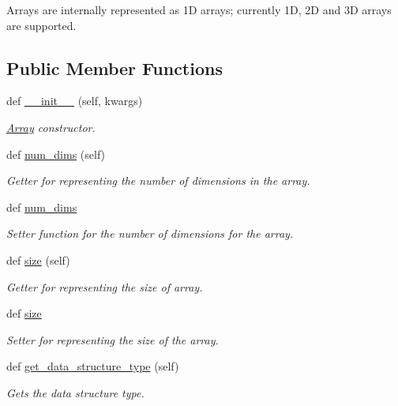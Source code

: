 Arrays are internally represented as 1D arrays; currently 1D, 2D and 3D arrays are supported. \subsection*{Public Member Functions}
\begin{DoxyCompactItemize}
\item 
def \hyperlink{classbridges_1_1array_1_1_array_ac772cbf7ad482b235e30929c8e1063a4}{\+\_\+\+\_\+init\+\_\+\+\_\+} (self, kwargs)
\begin{DoxyCompactList}\small\item\em \hyperlink{classbridges_1_1array_1_1_array}{Array} constructor. \end{DoxyCompactList}\item 
def \hyperlink{classbridges_1_1array_1_1_array_aaef2013f0e3befd61c0497638f409bc8}{num\+\_\+dims} (self)
\begin{DoxyCompactList}\small\item\em Getter for representing the number of dimensions in the array. \end{DoxyCompactList}\item 
def \hyperlink{classbridges_1_1array_1_1_array_ab7374f0d4bb0a9514b4af29bdd8935a5}{num\+\_\+dims}
\begin{DoxyCompactList}\small\item\em Setter function for the number of dimensions for the array. \end{DoxyCompactList}\item 
def \hyperlink{classbridges_1_1array_1_1_array_a01292e2099a89d0927855c25aedc8662}{size} (self)
\begin{DoxyCompactList}\small\item\em Getter for representing the size of array. \end{DoxyCompactList}\item 
def \hyperlink{classbridges_1_1array_1_1_array_a28cc9cbafb4e0d0fbfe22c12d1717351}{size}
\begin{DoxyCompactList}\small\item\em Setter for representing the size of the array. \end{DoxyCompactList}\item 
def \hyperlink{classbridges_1_1array_1_1_array_a27dcb7a04798a215092f42506da679ce}{get\+\_\+data\+\_\+structure\+\_\+type} (self)
\begin{DoxyCompactList}\small\item\em Gets the data structure type. \end{DoxyCompactList}\item 

\end{DoxyCompactItemize}
